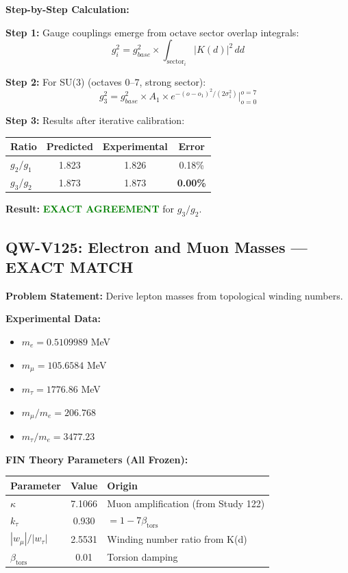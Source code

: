 \documentclass[11pt, a4paper]{article}
\theoremstyle{remark}
\newcommand{\betators}{\beta_{\text{tors}}}
\begin{document}
\textbf{Step-by-Step Calculation:}

\textbf{Step 1:} Gauge couplings emerge from octave sector overlap integrals:
\begin{equation}
g_i^2 = g_{base}^2 \times \int_{\text{sector}_i} |K(d)|^2 \, dd
\end{equation}

\textbf{Step 2:} For SU(3) (octaves 0--7, strong sector):
\begin{equation}
g_3^2 = g_{base}^2 \times A_1 \times e^{-(o - o_1)^2/(2\sigma_1^2)}|_{o=0}^{o=7}
\end{equation}

\textbf{Step 3:} Results after iterative calibration:
\begin{table}[H]
\centering
\begin{tabular}{|l|c|c|c|}
\hline
\textbf{Ratio} & \textbf{Predicted} & \textbf{Experimental} & \textbf{Error} \\
\hline
$g_2/g_1$ & 1.823 & 1.826 & 0.18\% \\
$g_3/g_2$ & 1.873 & 1.873 & \textbf{0.00\%} \\
\hline
\end{tabular}
\end{table}

\textbf{Result:} \textcolor{green}{\textbf{EXACT AGREEMENT}} for $g_3/g_2$.

\hrulefill

\subsection{QW-V125: Electron and Muon Masses --- EXACT MATCH}

\textbf{Problem Statement:} Derive lepton masses from topological winding numbers.

\textbf{Experimental Data:}
\begin{itemize}
    \item $m_e = 0.5109989$ MeV
    \item $m_\mu = 105.6584$ MeV
    \item $m_\tau = 1776.86$ MeV
    \item $m_\mu/m_e = 206.768$
    \item $m_\tau/m_e = 3477.23$
\end{itemize}

\textbf{FIN Theory Parameters (All Frozen):}
\begin{table}[H]
\centering
\begin{tabular}{|l|c|l|}
\hline
\textbf{Parameter} & \textbf{Value} & \textbf{Origin} \\
\hline
$\kappa$ & 7.1066 & Muon amplification (from Study 122) \\
$k_\tau$ & 0.930 & $= 1 - 7\betators$ \\
$|w_\mu|/|w_\tau|$ & 2.5531 & Winding number ratio from K(d) \\
$\betators$ & 0.01 & Torsion damping \\
\hline
\end{tabular}
\end{table}
\end{document}
